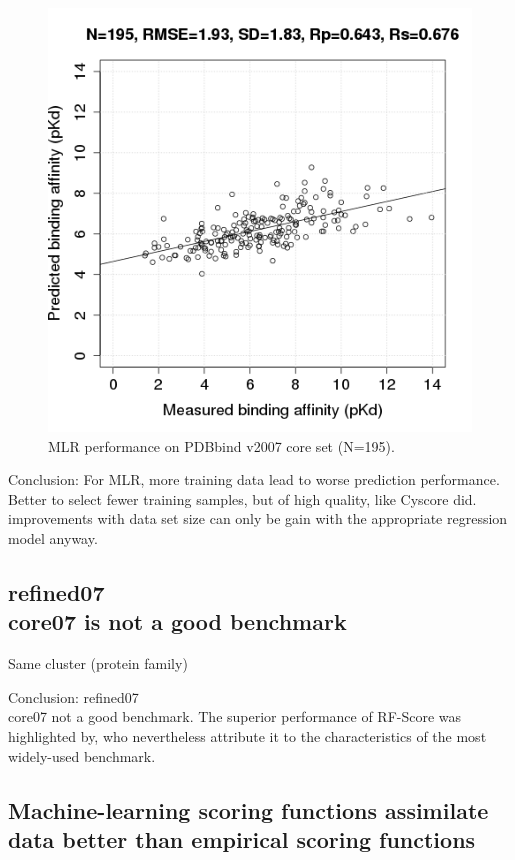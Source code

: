 \documentclass[journal=jacsat,manuscript=article]{achemso}
\begin{document}
\begin{figure}
\endminipage\hfill
{}%
\includegraphics[width=1.4\linewidth,natwidth=480,natheight=480]{../rfcyscore/x4/mlr/trn-2280-tst-195-yp.png}
\endminipage
\caption{MLR performance on PDBbind v2007 core set (N=195).}
\label{fig:mlr-tst-195}
\end{figure}

Conclusion: For MLR, more training data lead to worse prediction performance. Better to select fewer training samples, but of high quality, like Cyscore did.
improvements with data set size can only be gain with the appropriate regression model anyway.

\subsection{refined07\\core07 is not a good benchmark}

Same cluster (protein family)

Conclusion: refined07\\core07 not a good benchmark.
The superior performance of RF-Score was highlighted by, who nevertheless attribute it to the characteristics of the most widely-used benchmark. \cite{774}

\subsection{Machine-learning scoring functions assimilate data better than empirical scoring functions}
\end{document}
